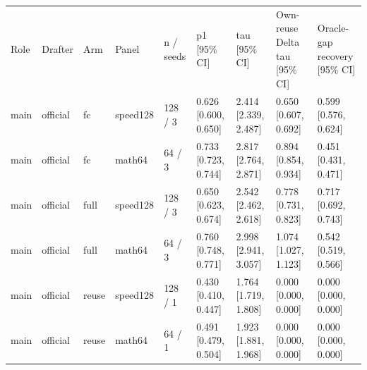 \begin{tabular}{lllllllll}
Role & Drafter & Arm & Panel & n / seeds & p1 [95\% CI] & tau [95\% CI] & Own-reuse Delta tau [95\% CI] & Oracle-gap recovery [95\% CI] \\
main & official & fc & speed128 & 128 / 3 & 0.626 [0.600, 0.650] & 2.414 [2.339, 2.487] & 0.650 [0.607, 0.692] & 0.599 [0.576, 0.624] \\
main & official & fc & math64 & 64 / 3 & 0.733 [0.723, 0.744] & 2.817 [2.764, 2.871] & 0.894 [0.854, 0.934] & 0.451 [0.431, 0.471] \\
main & official & full & speed128 & 128 / 3 & 0.650 [0.623, 0.674] & 2.542 [2.462, 2.618] & 0.778 [0.731, 0.823] & 0.717 [0.692, 0.743] \\
main & official & full & math64 & 64 / 3 & 0.760 [0.748, 0.771] & 2.998 [2.941, 3.057] & 1.074 [1.027, 1.123] & 0.542 [0.519, 0.566] \\
main & official & reuse & speed128 & 128 / 1 & 0.430 [0.410, 0.447] & 1.764 [1.719, 1.808] & 0.000 [0.000, 0.000] & 0.000 [0.000, 0.000] \\
main & official & reuse & math64 & 64 / 1 & 0.491 [0.479, 0.504] & 1.923 [1.881, 1.968] & 0.000 [0.000, 0.000] & 0.000 [0.000, 0.000] \\
\end{tabular}
